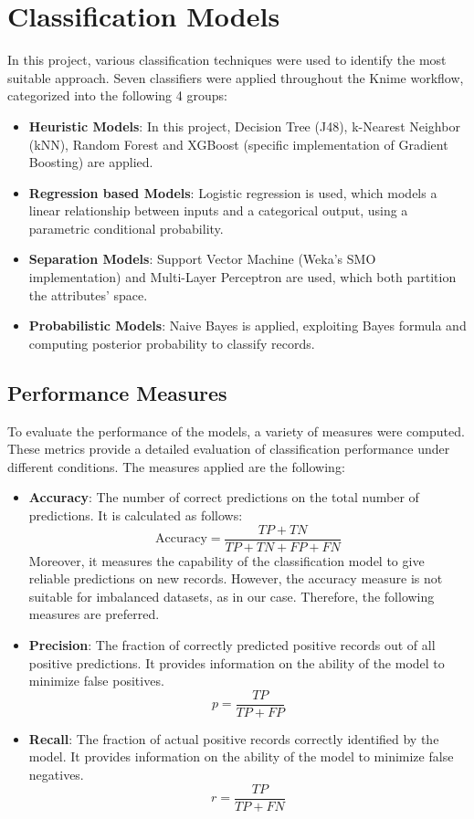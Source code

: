 \section{Classification Models}
In this project, various classification techniques were used to identify the most suitable approach. Seven classifiers were applied throughout the Knime workflow, categorized into the following 4 groups:
\begin{itemize}
    \item \textbf{Heuristic Models}: In this project, Decision Tree (J48), k-Nearest Neighbor (kNN), Random Forest and XGBoost (specific implementation of Gradient Boosting) are applied.
    \item \textbf{Regression based Models}: Logistic regression is used, which models a linear relationship between inputs and a categorical output, using a parametric conditional probability.
    \item \textbf{Separation Models}: Support Vector Machine (Weka's SMO implementation) and Multi-Layer Perceptron are used, which both partition the attributes' space.
    \item \textbf{Probabilistic Models}: Naive Bayes is applied, exploiting Bayes formula and computing posterior probability to classify records.
\end{itemize}

\subsection{Performance Measures}
To evaluate the performance of the models, a variety of measures were computed. These metrics provide a detailed evaluation of classification performance under different conditions. The measures applied are the following:
\begin{itemize}
    \item \textbf{Accuracy}: The number of correct predictions on the total number of predictions. It is calculated as follows:
    \[
    \text{Accuracy} = \frac{TP + TN}{TP + TN + FP + FN}
    \]
    Moreover, it measures the capability of the classification model to give reliable predictions on new records. However, the accuracy measure is not suitable for imbalanced datasets, as in our case. Therefore, the following measures are preferred.

    \item \textbf{Precision}: The fraction of correctly predicted positive records out of all positive predictions. It provides information on the ability of the model to minimize false positives.
    \[
    p = \frac{TP}{TP + FP}
    \]
    \item \textbf{Recall}: The fraction of actual positive records correctly identified by the model. It provides information on the ability of the model to minimize false negatives.
    \[
    r = \frac{TP}{TP + FN}
    \]
    
\end{itemize}


